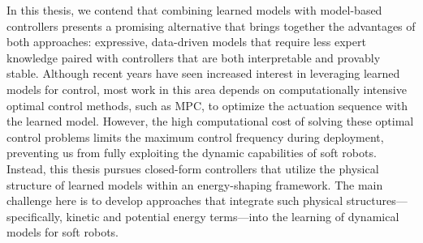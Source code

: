 
In this thesis, we contend that combining learned models with model-based controllers presents a promising alternative that brings together the advantages of both approaches: expressive, data-driven models that require less expert knowledge paired with controllers that are both interpretable and provably stable. Although recent years have seen increased interest in leveraging learned models for control, most work in this area depends on computationally intensive optimal control methods, such as MPC, to optimize the actuation sequence with the learned model. However, the high computational cost of solving these optimal control problems limits the maximum control frequency during deployment, preventing us from fully exploiting the dynamic capabilities of soft robots. Instead, this thesis pursues closed-form controllers that utilize the physical structure of learned models within an energy-shaping framework. The main challenge here is to develop approaches that integrate such physical structures—specifically, kinetic and potential energy terms—into the learning of dynamical models for soft robots.
